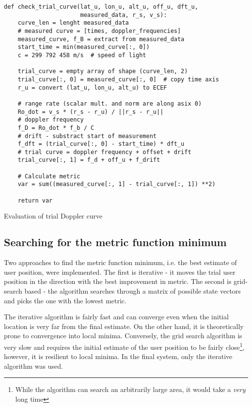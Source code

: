 \begin{algorithm}
    \centering
    \begin{verbatim}
def check_trial_curve(lat_u, lon_u, alt_u, off_u, dft_u, 
                      measured_data, r_s, v_s):                      
    curve_len = lenght measured_data
    # measured curve = [times, doppler_frequencies]
    measured_curve, f_B = extract from measured_data
    start_time = min(measured_curve[:, 0])
    c = 299 792 458 m/s  # speed of light
    
    trial_curve = empty array of shape (curve_len, 2)
    trial_curve[:, 0] = measured_curve[:, 0]  # copy time axis
    r_u = convert (lat_u, lon_u, alt_u) to ECEF

    # range rate (scalar mult. and norm are along asix 0)
    Ro_dot = v_s * (r_s - r_u) / ||r_s - r_u|| 
    # doppler frequency 
    f_D = Ro_dot * f_b / C  
    # drift - substract start of measurement
    f_dft = (trial_curve[:, 0] - start_time) * dft_u
    # trial curve = doppler frequency + offset + drift
    trial_curve[:, 1] = f_d + off_u + f_drift

    # Calculate metric
    var = sum((measured_curve[:, 1] - trial_curve[:, 1]) **2)
    
    return var
    \end{verbatim}
    \caption{Evaluation of trial Doppler curve}
    \label{a_des_check_trial_curve}
\end{algorithm}


\subsection{Searching for the metric function minimum}
Two approaches to find the metric function minimum, i.e. the best estimate of user position, were implemented. The first is iterative - it moves the trial user position in the direction with the best improvement in metric. The second is grid-search based - the algorithm searches through a matrix of possible state vectors and picks the one with the lowest metric.

The iterative algorithm is fairly fast and can converge even when the initial location is very far from the final estimate. On the other hand, it is theoretically prone to convergence into local minima. Conversely, the grid search algorithm is very slow and requires the initial estimate of the user position to be fairly close\footnote{While the algorithm can search an arbitrarily large area, it would take a \textit{very} long time}, however, it is resilient to local minima. In the final system, only the iterative algorithm was used.

